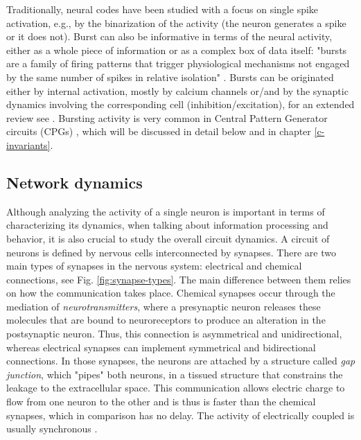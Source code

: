 Traditionally, neural codes have been studied with a focus on single spike activation, e.g., by the binarization of the activity (the neuron generates a spike or it does not). Burst can also be informative in terms of the neural activity, either as a whole piece of information or as a complex box of data itself: "bursts are a family of firing patterns that trigger physiological mechanisms not engaged by the same number of spikes in relative isolation" \parencite{friedenberger_silences_2023}. Bursts can be originated either by internal activation, mostly by calcium channels or/and by the synaptic dynamics involving the corresponding cell (inhibition/excitation), for an extended review see \parencite{friedenberger_silences_2023}. Bursting activity is very common in Central Pattern Generator circuits (CPGs) \parencite{katz_evolution_2016,steuer_central_2018}, which will be discussed in detail below and in chapter \ref{c-invariants}.

\subsection{Network dynamics}

Although analyzing the activity of a single neuron is important in terms of characterizing its dynamics, when talking about information processing and behavior, it is also crucial to study the overall circuit dynamics. A circuit of neurons is defined by nervous cells interconnected by synapses. There are two main types of synapses in the nervous system: electrical and chemical connections, see Fig. \ref{fig:synapse-types}. The main difference between them relies on how the communication takes place. Chemical synapses occur through the mediation of \textit{neurotransmitters}, where a presynaptic neuron releases these molecules that are bound to neuroreceptors to produce an alteration in the postsynaptic neuron. Thus, this connection is asymmetrical and unidirectional, whereas  electrical synapses can implement symmetrical and bidirectional connections. In those synapses, the neurons are attached by a structure called \textit{gap junction}, which "pipes" both neurons, in a tissued structure that constrains the leakage to the extracellular space. This communication allows electric charge to flow from one neuron to the other and is thus is faster than the chemical synapses, which in comparison has no delay. The activity of electrically coupled is usually synchronous \parencite{levitan_neuron_2002}.

